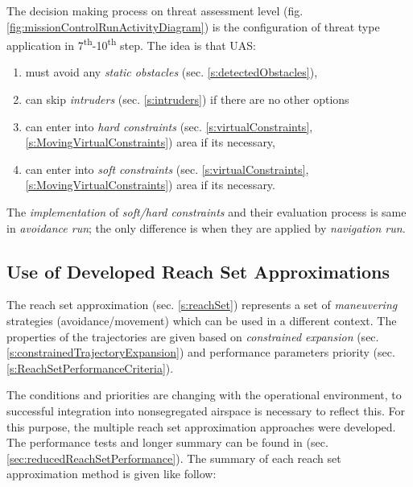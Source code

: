 The decision making process on threat assessment level (fig. \ref{fig:missionControlRunActivityDiagram}) is the configuration of threat type application in 7\textsuperscript{th}-10\textsuperscript{th} step. The idea is that UAS:
\begin{enumerate}
    \item must avoid any \emph{static obstacles} (sec. \ref{s:detectedObstacles}),
    
    \item can skip \emph{intruders} (sec. \ref{s:intruders}) if there are no other options
    
    \item can enter into \emph{hard constraints} (sec. \ref{s:virtualConstraints}, \ref{s:MovingVirtualConstraints}) area if its necessary,
    
    \item can enter into \emph{soft constraints} (sec. \ref{s:virtualConstraints}, \ref{s:MovingVirtualConstraints}) area if its necessary.
\end{enumerate}

\begin{note}
    The \emph{implementation} of \emph{soft/hard constraints} and their evaluation process is same in \emph{avoidance run}; the only difference is when they are applied by \emph{navigation run}.
\end{note}
    
\subsection{Use of Developed Reach Set Approximations}\label{s:conclusionReachSet}

\noindent The reach set approximation (sec. \ref{s:reachSet}) represents a set of  \emph{maneuvering} strategies (avoidance/movement) which can be used in a different context. The properties of the trajectories are given based on \emph{constrained expansion} (sec. \ref{s:constrainedTrajectoryExpansion}) and performance parameters priority (sec. \ref{s:ReachSetPerformanceCriteria}).

The conditions and priorities are changing with the operational environment, to successful integration into nonsegregated airspace is necessary to reflect this.  For this purpose, the multiple reach set approximation approaches were developed. The performance tests and longer summary can be found in (sec. \ref{sec:reducedReachSetPerformance}). The summary of each reach set approximation method is given like follow:


